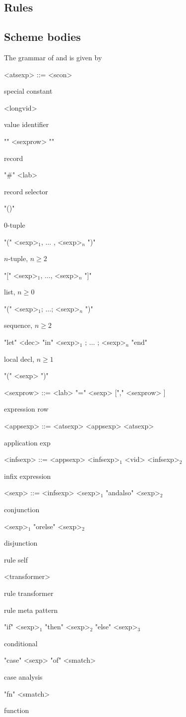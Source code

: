 \subsection{Rules}




\subsection{Scheme bodies}

The grammar of  and  is given by




\begin{nonfloatingtable}

\setlength{\grammarindent}{7em}

\newcommand{\cmt}[1]{\parbox{8em}{\small{#1}}}

\begin{grammar}
 
  <atsexp> ::= <scon>                                            \hfill \cmt{special constant}
  \alt ["op"] <longvid>                                          \hfill \cmt{value identifier}
  \alt "{" <sexprow> "}"                                         \hfill \cmt{record}
  \alt "\#" <lab>                                                \hfill \cmt{record selector}
  \alt "()"                                                      \hfill \cmt{$0$-tuple}
  \alt "(" <sexp>$_1$, $\ldots$ , <sexp>$_n$ ")"                 \hfill \cmt{$n$-tuple, $n \geq 2$}
  \alt "[" <sexp>$_1$, $\ldots$, <sexp>$_n$ "]"                  \hfill \cmt{list, $n \geq 0$}
  \alt "(" <sexp>$_1$; $\ldots$; <sexp>$_n$ ")"                  \hfill \cmt{sequence, $n \geq 2$}  
  \alt "let" <dec> "in" <sexp>$_1$ ; $\ldots$ ; <sexp>$_n$ "end" \hfill \cmt{local decl, $n \geq 1$}
  \alt "(" <sexp> ")"
  
  <sexprow> ::= <lab> "=" <sexp> ["," <sexprow> ]          \hfill \cmt{expression row}

  <appsexp> ::= <atsexp>
  \alt <appsexp> <atsexp>                                  \hfill \cmt{application exp}

  <infsexp> ::= <appsexp>
  \alt <infsexp>$_1$ <vid> <infsexp>$_2$                   \hfill \cmt{infix expression}
  
  <sexp> ::= <infsexp>
  \alt <sexp>$_1$ "andalso" <sexp>$_2$                     \hfill \cmt{conjunction}
  \alt <sexp>$_1$ "orelse"  <sexp>$_2$                     \hfill \cmt{disjunction}
                                           \hfill \cmt{rule self}
  \alt <transformer>                                       \hfill \cmt{rule transformer}
                                   \hfill \cmt{rule meta pattern}
  \alt "if" <sexp>$_1$ "then" <sexp>$_2$ "else" <sexp>$_3$ \hfill \cmt{conditional}
  \alt "case" <sexp> "of" <smatch>                         \hfill \cmt{case analysis}
  \alt "fn" <smatch>                                       \hfill \cmt{function}
  

\end{grammar}
\end{nonfloatingtable}
